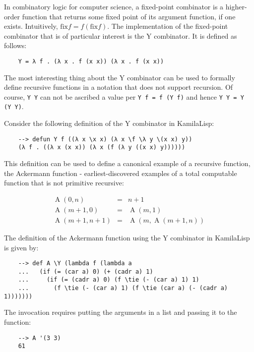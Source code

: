 In combinatory logic for computer science, a fixed-point combinator is a higher-order function that returns some fixed point of its argument function, if one exists. Intuitively, $\text{fix} f = f (\text{fix} f)$. The implementation of the fixed-point combinator that is of particular interest is the Y combinator. It is defined as follows:

\begin{Verbatim}
    Y = λ f . (λ x . f (x x)) (λ x . f (x x))
\end{Verbatim}

The most interesting thing about the Y combinator can be used to formally define recursive functions in a notation that does not support recursion. Of course, \verb|Y Y| can not be ascribed a value per \verb|Y f = f (Y f)| and hence \verb|Y Y = Y (Y Y)|.

Consider the following definition of the Y combinator in KamilaLisp:

\begin{Verbatim}
    --> defun Y f ((λ x \x x) (λ x \f \λ y \(x x) y))
    (λ f . ((λ x (x x)) (λ x (f (λ y ((x x) y))))))
\end{Verbatim}

This definition can be used to define a canonical example of a recursive function, the Ackermann function - earliest-discovered examples of a total computable function that is not primitive recursive:

$$
\begin{array}{lcl}
    \operatorname {A} (0,n)&=&n+1\\
    \operatorname {A} (m+1,0)&=&\operatorname {A} (m,1)\\
    \operatorname {A} (m+1,n+1)&=&\operatorname {A} (m,\operatorname {A} (m+1,n))
\end{array}
$$

The definition of the Ackermann function using the Y combinator in KamilaLisp is given by:

\begin{Verbatim}
    --> def A \Y (lambda f (lambda a
    ...   (if (= (car a) 0) (+ (cadr a) 1)
    ...     (if (= (cadr a) 0) (f \tie (- (car a) 1) 1)
    ...       (f \tie (- (car a) 1) (f \tie (car a) (- (cadr a) 1)))))))
\end{Verbatim}

The invocation requires putting the arguments in a list and passing it to the function:

\begin{Verbatim}
    --> A '(3 3)
    61
\end{Verbatim}

